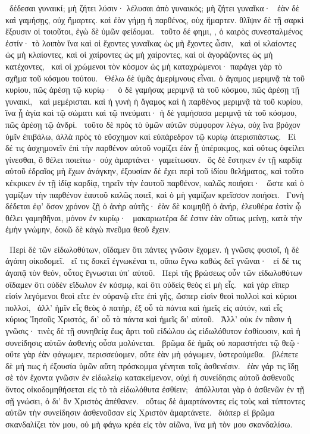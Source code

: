~δέδεσαι γυναικί; μὴ ζήτει λύσιν· λέλυσαι ἀπὸ γυναικός; μὴ ζήτει γυναῖκα·
~ἐὰν δὲ καὶ γαμήσῃς, οὐχ ἥμαρτες. καὶ ἐὰν γήμῃ ἡ παρθένος, οὐχ ἥμαρτεν. θλῖψιν δὲ τῇ σαρκὶ ἕξουσιν οἱ τοιοῦτοι, ἐγὼ δὲ ὑμῶν φείδομαι.
~τοῦτο δέ φημι, , ὁ καιρὸς συνεσταλμένος ἐστίν· τὸ λοιπὸν ἵνα καὶ οἱ ἔχοντες γυναῖκας ὡς μὴ ἔχοντες ὦσιν,
~καὶ οἱ κλαίοντες ὡς μὴ κλαίοντες, καὶ οἱ χαίροντες ὡς μὴ χαίροντες, καὶ οἱ ἀγοράζοντες ὡς μὴ κατέχοντες,
~καὶ οἱ χρώμενοι τὸν κόσμον ὡς μὴ καταχρώμενοι· παράγει γὰρ τὸ σχῆμα τοῦ κόσμου τούτου.
~Θέλω δὲ ὑμᾶς ἀμερίμνους εἶναι. ὁ ἄγαμος μεριμνᾷ τὰ τοῦ κυρίου, πῶς ἀρέσῃ τῷ κυρίῳ·
~ὁ δὲ γαμήσας μεριμνᾷ τὰ τοῦ κόσμου, πῶς ἀρέσῃ τῇ γυναικί,
~καὶ μεμέρισται. καὶ ἡ γυνὴ ἡ ἄγαμος καὶ ἡ παρθένος μεριμνᾷ τὰ τοῦ κυρίου, ἵνα ᾖ ἁγία καὶ τῷ σώματι καὶ τῷ πνεύματι· ἡ δὲ γαμήσασα μεριμνᾷ τὰ τοῦ κόσμου, πῶς ἀρέσῃ τῷ ἀνδρί.
~τοῦτο δὲ πρὸς τὸ ὑμῶν αὐτῶν σύμφορον λέγω, οὐχ ἵνα βρόχον ὑμῖν ἐπιβάλω, ἀλλὰ πρὸς τὸ εὔσχημον καὶ εὐπάρεδρον τῷ κυρίῳ ἀπερισπάστως.
~Εἰ δέ τις ἀσχημονεῖν ἐπὶ τὴν παρθένον αὐτοῦ νομίζει ἐὰν ᾖ ὑπέρακμος, καὶ οὕτως ὀφείλει γίνεσθαι, ὃ θέλει ποιείτω· οὐχ ἁμαρτάνει· γαμείτωσαν.
~ὃς δὲ ἕστηκεν ἐν τῇ καρδίᾳ αὐτοῦ ἑδραῖος μὴ ἔχων ἀνάγκην, ἐξουσίαν δὲ ἔχει περὶ τοῦ ἰδίου θελήματος, καὶ τοῦτο κέκρικεν ἐν τῇ ἰδίᾳ καρδίᾳ, τηρεῖν τὴν ἑαυτοῦ παρθένον, καλῶς ποιήσει·
~ὥστε καὶ ὁ γαμίζων τὴν παρθένον ἑαυτοῦ καλῶς ποιεῖ, καὶ ὁ μὴ γαμίζων κρεῖσσον ποιήσει.
~Γυνὴ δέδεται ἐφ’ ὅσον χρόνον ζῇ ὁ ἀνὴρ αὐτῆς· ἐὰν δὲ κοιμηθῇ ὁ ἀνήρ, ἐλευθέρα ἐστὶν ᾧ θέλει γαμηθῆναι, μόνον ἐν κυρίῳ·
~μακαριωτέρα δέ ἐστιν ἐὰν οὕτως μείνῃ, κατὰ τὴν ἐμὴν γνώμην, δοκῶ δὲ κἀγὼ πνεῦμα θεοῦ ἔχειν.

~Περὶ δὲ τῶν εἰδωλοθύτων, οἴδαμεν ὅτι πάντες γνῶσιν ἔχομεν. ἡ γνῶσις φυσιοῖ, ἡ δὲ ἀγάπη οἰκοδομεῖ.
~εἴ τις δοκεῖ ἐγνωκέναι τι, οὔπω ἔγνω καθὼς δεῖ γνῶναι·
~εἰ δέ τις ἀγαπᾷ τὸν θεόν, οὗτος ἔγνωσται ὑπ’ αὐτοῦ.
~Περὶ τῆς βρώσεως οὖν τῶν εἰδωλοθύτων οἴδαμεν ὅτι οὐδὲν εἴδωλον ἐν κόσμῳ, καὶ ὅτι οὐδεὶς θεὸς εἰ μὴ εἷς.
~καὶ γὰρ εἴπερ εἰσὶν λεγόμενοι θεοὶ εἴτε ἐν οὐρανῷ εἴτε ἐπὶ γῆς, ὥσπερ εἰσὶν θεοὶ πολλοὶ καὶ κύριοι πολλοί,
~ἀλλ’ ἡμῖν εἷς θεὸς ὁ πατήρ, ἐξ οὗ τὰ πάντα καὶ ἡμεῖς εἰς αὐτόν, καὶ εἷς κύριος Ἰησοῦς Χριστός, δι’ οὗ τὰ πάντα καὶ ἡμεῖς δι’ αὐτοῦ.
~Ἀλλ’ οὐκ ἐν πᾶσιν ἡ γνῶσις· τινὲς δὲ τῇ συνηθείᾳ ἕως ἄρτι τοῦ εἰδώλου ὡς εἰδωλόθυτον ἐσθίουσιν, καὶ ἡ συνείδησις αὐτῶν ἀσθενὴς οὖσα μολύνεται.
~βρῶμα δὲ ἡμᾶς οὐ παραστήσει τῷ θεῷ· οὔτε γὰρ ἐὰν φάγωμεν, περισσεύομεν, οὔτε ἐὰν μὴ φάγωμεν, ὑστερούμεθα.
~βλέπετε δὲ μή πως ἡ ἐξουσία ὑμῶν αὕτη πρόσκομμα γένηται τοῖς ἀσθενέσιν.
~ἐὰν γάρ τις ἴδῃ σὲ τὸν ἔχοντα γνῶσιν ἐν εἰδωλείῳ κατακείμενον, οὐχὶ ἡ συνείδησις αὐτοῦ ἀσθενοῦς ὄντος οἰκοδομηθήσεται εἰς τὸ τὰ εἰδωλόθυτα ἐσθίειν;
~ἀπόλλυται γὰρ ὁ ἀσθενῶν ἐν τῇ σῇ γνώσει, ὁ  δι’ ὃν Χριστὸς ἀπέθανεν.
~οὕτως δὲ ἁμαρτάνοντες εἰς τοὺς  καὶ τύπτοντες αὐτῶν τὴν συνείδησιν ἀσθενοῦσαν εἰς Χριστὸν ἁμαρτάνετε.
~διόπερ εἰ βρῶμα σκανδαλίζει τὸν  μου, οὐ μὴ φάγω κρέα εἰς τὸν αἰῶνα, ἵνα μὴ τὸν  μου σκανδαλίσω.

